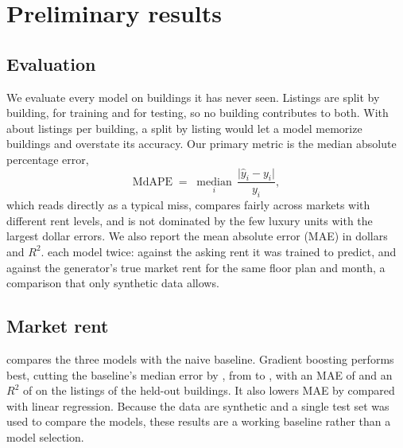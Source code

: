 \section{Preliminary results}\label{sec:results}


\subsection{Evaluation}\label{sec:evaluation}

We evaluate every model on buildings it has never seen. Listings are split by building,
\nTrainBuildings{} for training and \nTestBuildings{} for testing, so no building contributes to
both. With about \listingsPerBuilding{} listings per building, a split by listing would let a model
memorize buildings and overstate its accuracy. Our primary metric is the median absolute percentage
error,
\[
  \mathrm{MdAPE} \;=\; \operatorname*{median}_{i}\, \frac{\lvert \hat{y}_i - y_i \rvert}{y_i},
\]
which reads directly as a typical miss, compares fairly across markets with different rent levels,
and is not dominated by the few luxury units with the largest dollar errors. We also report the mean
absolute error (MAE) in dollars and \(R^2\).  each model twice: against the
asking rent it was trained to predict, and against the generator's true market rent for the same
floor plan and month, a comparison that only synthetic data allows. 

\subsection{Market rent}\label{sec:market-rent}

 compares the three models with the naive baseline. Gradient boosting performs
best, cutting the baseline's median error by \errorReduction{}, from \baseMdape{} to \gbmMdape{}, with
an MAE of \gbmMae{} and an \(R^2\) of \gbmRsq{} on the \nTestListings{} listings of the held-out
buildings. It also lowers MAE by \gbmVsLinear{} compared with linear regression. Because the data
are synthetic and a single test set was used to compare the models, these results are a working
baseline rather than a model selection.

